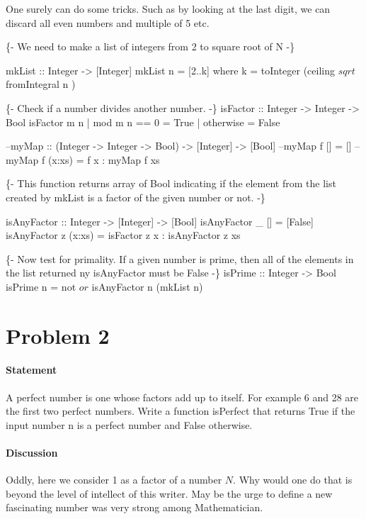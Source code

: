 \documentclass{report}%
\begin{document}
One surely can do some tricks. Such as by looking at the last digit,
we can discard all even numbers and multiple of 5 etc.

\nwenddocs{}\endmoddef\nwstartdeflinemarkup\nwenddeflinemarkup
\{- We need to make a list of integers from 2 to square root of N -\}

mkList :: Integer -> [Integer]
mkList n = [2..k] 
    where k = toInteger (ceiling $ sqrt $ fromIntegral n )

\{- Check if a number divides another number. -\}
isFactor :: Integer -> Integer -> Bool
isFactor m n | mod m n == 0 = True
             | otherwise = False

--myMap :: (Integer -> Integer -> Bool) ->  [Integer] -> [Bool]
--myMap f  [] = []
--myMap f  (x:xs) = f x : myMap f xs

\{- This function returns array of Bool indicating if the element from
the list created by mkList is a factor of the given number or not. -\}

isAnyFactor :: Integer -> [Integer] -> [Bool]
isAnyFactor _ [] = [False]
isAnyFactor z (x:xs) = isFactor z x : isAnyFactor z xs


\{- Now test for primality. If a given number is prime, then all of the
elements in the list returned ny isAnyFactor must be False -\}
isPrime :: Integer -> Bool
isPrime n = not $ or $ isAnyFactor n (mkList n)

\nwendcode{}\nwdocspar

\section{Problem 2}
\paragraph{Statement}
A  perfect  number  is  one  whose  factors  add  up  to  itself.
For example 6 and 28 are the  first two perfect numbers.  Write a function
isPerfect that returns True if the input number n is a perfect  number
and False otherwise. 

\paragraph{Discussion}
    
    Oddly, here we consider 1 as a factor of a number $N$. Why would one
    do that is beyond the level of intellect of this writer. May be the
    urge to define a new fascinating number was very strong among
    Mathematician.
\end{document}
